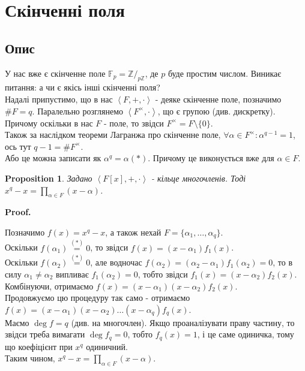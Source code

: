 \documentclass[a4paper, 10pt]{article}
\makeatletter
\theoremstyle{theoremdd}
\theoremstyle{theoremdd}
\theoremstyle{theoremdd}
\theoremstyle{theoremdd}
\theoremstyle{theoremdd}
\newtheorem{proposition}[theorem]{Proposition}
\theoremstyle{theoremdd}
\theoremstyle{theoremdd}
\theoremstyle{theoremdd}
\renewenvironment{proof}[1][Proof.\\]{\par
\pushQED{\hfill \qed}%
\normalfont \topsep6\p@\@plus6\p@\relax
\trivlist
\item\relax
{\bfseries
#1\@addpunct{.}}\hspace\labelsep\ignorespaces
}{%
\popQED\endtrivlist\@endpefalse
}
\makeatother
\begin{document}
\section{Скінченні поля}
\subsection{Опис}
У нас вже є скінченне поле $\mathbb{F}_p = \mathbb{Z}/_{p \mathbb{Z}}$, де $p$ буде простим числом. Виникає питання: а чи є якісь інші скінченні поля?
\bigskip \\
Надалі припустимо, що в нас $\left< F, +, \cdot \right>$ - деяке скінченне поле, позначимо $\# F = q$. Паралельно розглянемо $\left< F^\times, \cdot \right>$, що є групою (див. дискретку). Причому оскільки в нас $F$ - поле, то звідси $F^\times = F \setminus \{0\}$.\\
Також за наслідком теореми Лагранжа про скінченне поле, $\forall \alpha \in F^\times: \alpha^{q-1} = 1$, ось тут $q-1 = \# F^\times$.\\
Або це можна записати як $\alpha^q = \alpha (*)$. Причому це виконується вже для $\alpha \in F$.

\begin{proposition}
Задано $\left< F[x], + ,\cdot \right>$ - кільце многочленів. Тоді\\
$x^q - x = \displaystyle\prod_{\alpha \in F} (x-\alpha)$.
\end{proposition}

\begin{proof}
Позначимо $f(x) = x^q - x$, а також нехай $F = \{ \alpha_1,\dots,\alpha_q \}$.\\
Оскільки $f(\alpha_1) \overset{(*)}{=} 0$, то звідси $f(x) = (x-\alpha_1)f_1(x)$.\\
Оскільки $f(\alpha_2) \overset{(*)}{=} 0$, але водночас $f(\alpha_2) = (\alpha_2-\alpha_1) f_1(\alpha_2) = 0$, то в силу $\alpha_1 \neq \alpha_2$ випливає $f_1(\alpha_2) = 0$, тобто звідси $f_1(x) = (x-\alpha_2)f_2(x)$.\\
Комбінуючи, отримаємо $f(x) = (x-\alpha_1)(x-\alpha_2) f_2(x)$.\\
Продовжуємо цю процедуру так само - отримаємо $f(x) = (x-\alpha_1)(x-\alpha_2) \dots (x-\alpha_q) f_q(x)$.\\
Маємо $\deg f = q$ (див. на многочлен). Якщо проаналізувати праву частину, то звідси треба вимагати $\deg f_q = 0$, тобто $f_q(x) = 1$, і це саме одиничка, тому що коефіцієнт при $x^q$ одиничний.\\
Таким чином, $x^q - x = \displaystyle\prod_{\alpha \in F} (x-\alpha)$.
\end{proof}
\end{document}

